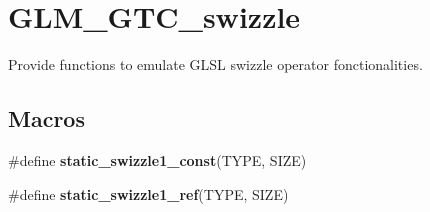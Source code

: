 \hypertarget{group__gtc__swizzle}{\section{G\-L\-M\-\_\-\-G\-T\-C\-\_\-swizzle}
\label{group__gtc__swizzle}
}


Provide functions to emulate G\-L\-S\-L swizzle operator fonctionalities.  


\subsection*{Macros}
\begin{DoxyCompactItemize}
\item 
\#define {\bfseries static\-\_\-swizzle1\-\_\-const}(T\-Y\-P\-E, S\-I\-Z\-E)
\item 
\#define {\bfseries static\-\_\-swizzle1\-\_\-ref}(T\-Y\-P\-E, S\-I\-Z\-E)
\end{DoxyCompactItemize}
